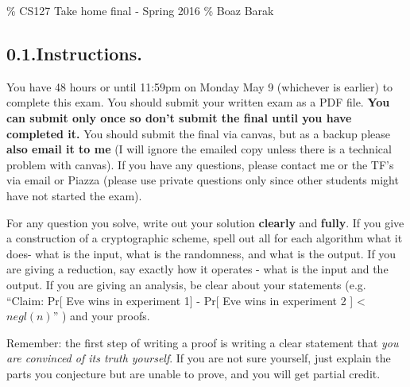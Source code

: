 \documentclass{article}
\begin{document}
\noindent{}\% CS127 Take home final - Spring 2016
\% Boaz Barak%


\newcommand{\zo}{\{0,1\}}
\newcommand{\E}{\mathbb{E}}
\newcommand{\Z}{\mathbb{Z}}
\newcommand{\R}{\mathbb{R}}
\newcommand{\getsr}{\leftarrow_R\;}

\newcommand{\floor}[1]{\lfloor #1 \rfloor}
\newcommand{\ceil}[1]{\lceil #1 \rceil}
\newcommand{\iprod}[1]{\langle #1 \rangle}

\newcommand{\cO}{\mathcal{O}}

\newcommand{\Gp}{\mathbb{G}}
\subsection{0.1.\hspace*{0.5em}Instructions.}\label{sec-instructions}%

\noindent{}You have 48 hours or until 11:59pm on Monday May 9 (whichever is earlier) to complete this exam. You should submit your written exam as a PDF file.
\textbf{You can submit only once so don't submit the final until you have completed it.}
You should submit the final via canvas, but as a backup please \textbf{also email it to me} (I will ignore the emailed copy unless there is a technical problem with canvas).
If you have any questions, please contact me or the TF's via email or Piazza (please use private questions only since other students might have not started the exam).%

For any question you solve, write out your solution \textbf{clearly} and \textbf{fully}.
If you give a construction of a cryptographic scheme, spell out all for each algorithm what it does- what is the input, what is the randomness, and what is the output.
If you are giving a reduction, say exactly how it operates - what is the input and the output.
If you are giving an analysis, be clear about your statements (e.g. \textquotedblleft{}Claim: \textbar{} Pr[ Eve wins in experiment 1] - Pr[ Eve wins in experiment 2 ] \textbar{} \textless{} $negl(n)$\textquotedblright{} ) and your proofs.%

Remember: the first step of writing a proof is writing a clear statement that \emph{you are convinced of its truth yourself}.\mdbr
{}If you are not sure yourself, just explain the parts you conjecture but are unable to prove, and you will get partial credit.%
\end{document}
